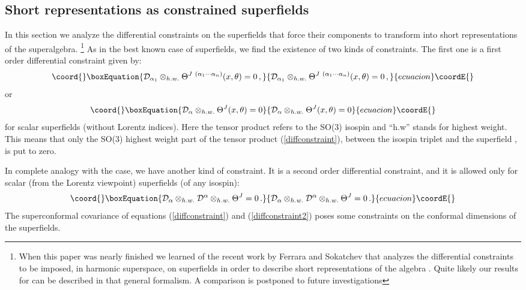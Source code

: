 \documentclass[a4paper,12pt]{article}
\begin{document}
\subsection{Short \coordHE{} representations as constrained
superfields}
In this section we analyze the differential constraints on the
superfields that force their components to transform into short
\coordHE{} representations of the \coordHE{} superalgebra.
\footnote{When this paper was nearly finished we learned of the
recent work by Ferrara and Sokatchev \cite{fersoka} that analyzes
the differential constraints to be imposed, in harmonic superspace,
on \coordHE{} superfields in order to describe short representations
of the algebra \coordHE{}. Quite likely our results for
\coordHE{} can be described in that general formalism.
A comparison is postponed to future investigations}
As in the best known case of \coordHE{} superfields, we find the
existence of two kinds of constraints.
The first one is a first order differential constraint given by:
\begin{equation}\coord{}\boxEquation{
{\cal D}_{\alpha_1}\otimes_{h.w.}
\Theta^{J\ (\alpha_1\cdots\alpha_n)}(x,\theta)=0\,,
\label{diffconstraint}
}{
{\cal D}_{\alpha_1}\otimes_{h.w.}
\Theta^{J\ (\alpha_1\cdots\alpha_n)}(x,\theta)=0\,,
}{ecuacion}\coordE{}\end{equation}
or
\begin{equation}\coord{}\boxEquation{
  {\cal D}_{\alpha}\otimes_{h.w.}\Theta^{J}(x,\theta)=0
\label{diffconszero}
}{
  {\cal D}_{\alpha}\otimes_{h.w.}\Theta^{J}(x,\theta)=0
}{ecuacion}\coordE{}\end{equation}
for scalar superfields (without Lorentz indices).
Here the tensor product refers to the SO(3)\coordHE{} isospin and ``h.w''
stands for highest weight.
This means that only the SO(3)\coordHE{} highest weight part of the tensor
product (\ref{diffconstraint}), between the isospin triplet \coordHE{}
and the superfield \coordHE{}, is put to zero.
\par
In complete analogy with the \coordHE{} case, we have another
kind of constraint.
It is a second order differential constraint, and it is allowed only
for scalar (from the Lorentz viewpoint) superfields (of any isospin):
\begin{equation}\coord{}\boxEquation{
{\cal D}_\alpha\otimes_{h.w.}{\cal D}^\alpha\otimes_{h.w.}\Theta^J=0\,.
\label{diffconstraint2}
}{
{\cal D}_\alpha\otimes_{h.w.}{\cal D}^\alpha\otimes_{h.w.}\Theta^J=0\,.
}{ecuacion}\coordE{}\end{equation}
The superconformal covariance of equations (\ref{diffconstraint}) and
(\ref{diffconstraint2}) poses some constraints on the conformal
dimensions of the superfields.
\end{document}
